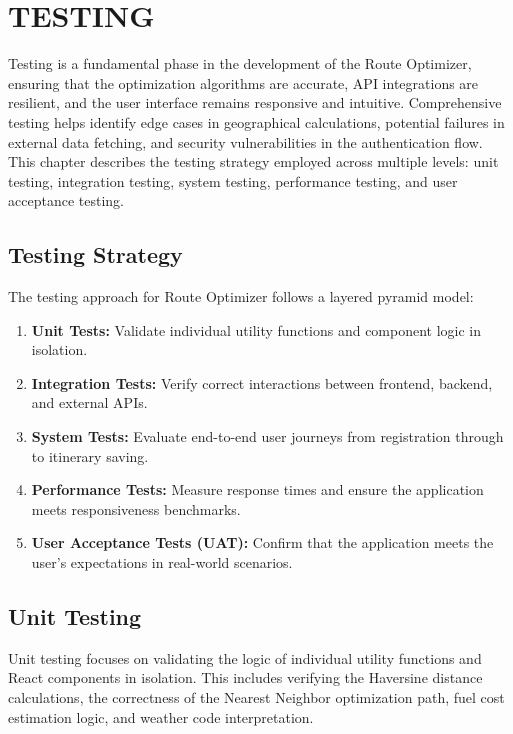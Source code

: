 \chapter{TESTING}
Testing is a fundamental phase in the development of the Route Optimizer, ensuring that the optimization algorithms are accurate, API integrations are resilient, and the user interface remains responsive and intuitive. Comprehensive testing helps identify edge cases in geographical calculations, potential failures in external data fetching, and security vulnerabilities in the authentication flow. This chapter describes the testing strategy employed across multiple levels: unit testing, integration testing, system testing, performance testing, and user acceptance testing.

\section{Testing Strategy}
The testing approach for Route Optimizer follows a layered pyramid model:
\begin{enumerate}
    \item \textbf{Unit Tests:} Validate individual utility functions and component logic in isolation.
    \item \textbf{Integration Tests:} Verify correct interactions between frontend, backend, and external APIs.
    \item \textbf{System Tests:} Evaluate end-to-end user journeys from registration through to itinerary saving.
    \item \textbf{Performance Tests:} Measure response times and ensure the application meets responsiveness benchmarks.
    \item \textbf{User Acceptance Tests (UAT):} Confirm that the application meets the user's expectations in real-world scenarios.
\end{enumerate}

\section{Unit Testing}
Unit testing focuses on validating the logic of individual utility functions and React components in isolation. This includes verifying the Haversine distance calculations, the correctness of the Nearest Neighbor optimization path, fuel cost estimation logic, and weather code interpretation.

